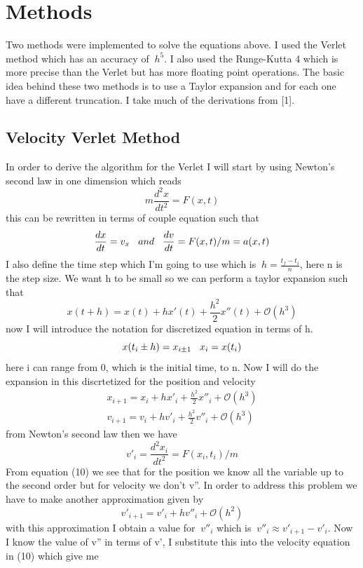 \documentclass[11pt,a4wide]{article}
\begin{document}
\section{Methods}
Two methods were implemented to solve the equations above. I used the Verlet method which has an accuracy of $\ h^5$. I also used the Runge-Kutta 4 which is more precise than the Verlet but has more floating point operations. The basic idea behind these two methods is to use a Taylor expansion and for each one have a different truncation. I take much of the derivations from [1]. 
\subsection{Velocity Verlet Method}
In order to derive the algorithm for the Verlet I will start by using Newton's second law  in one dimension which reads
\[
	m\frac{d^2x}{dt^2} = F(x,t) 
\]
this can be rewritten in terms of couple equation such that 
\[
	\frac{dx}{dt}=v_x  \hspace{0.3cm} and \hspace{0.3cm} \frac{dv}{dt}=F(x,t)/m=a(x,t)
\]
I also define the time step which I'm going to use which is $\ h=\frac{t_f -t_i}{n}$, here n is the step size. We want h to be small so we can perform a taylor expansion such that 
\[
	x(t+h)= x(t)+hx'(t) + \frac{h^2}{2}x''(t) + \mathcal{O}(h^3)
\]
now I will introduce the notation for discretized equation in terms of h. 
\begin{equation}
	x(t_i \pm h)=x_{i\pm 1} \hspace{0.3cm} x_i=x(t_i)
\end{equation}
here i can range from 0, which is the initial time, to n. Now I will do the expansion in this discrtetized for the position and velocity 
\begin{equation}
\begin{split}
	x_{i+1} = x_i + hx'_i + \frac{h^2}{2}x''_i + \mathcal{O}(h^3) \\
	v_{i+1} = v_i + hv'_i + \frac{h^2}{2}v''_i + \mathcal{O}(h^3)
\end{split}
\end{equation}
from Newton's second law then we have 
\[
	v'_i = \frac{d^2x_i}{dt^2}=F(x_i,t_i)/m
\]
From equation (10) we see that for the position we know all the variable up to the second order but for velocity we don't v''. In order to address this problem we have to make another approximation given by 
\[
	v'_{i+1} = v'_i + hv''_i + \mathcal{O}(h^2)
\]
with this approximation I obtain a value for $\ v''_i$ which is $\ v''_i \approx v'_{i+1} - v'_i$. Now I know the value of v'' in terms of v', I substitute this into the velocity equation in (10) which give me 
\end{document}
